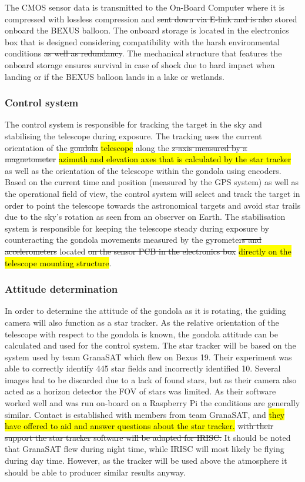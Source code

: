 The CMOS sensor data is transmitted to the On-Board Computer where it is compressed with lossless compression and \st{sent down via E-link and is also} stored onboard the BEXUS balloon. The onboard storage is located in the electronics box that is designed considering compatibility with the harsh environmental conditions \st{as well as redundancy}. The mechanical structure that features the onboard storage ensures survival in case of shock due to hard impact when landing or if the BEXUS balloon lands in a lake or wetlands.


\subsubsection{Control system}
The control system is responsible for tracking the target in the sky and stabilising the telescope during exposure. The tracking uses the current orientation of the \st{gondola} \hl{telescope} along the \st{z-axis measured by a magnetometer} \hl{azimuth and elevation axes that is calculated by the star tracker} as well as the orientation of the telescope within the gondola using encoders. Based on the current time and position (measured by the GPS system) as well as the operational field of view, the control system will select and track the target in order to point the telescope towards the astronomical targets and avoid star trails due to the sky's rotation as seen from an observer on Earth. The stabilisation system is responsible for keeping the telescope steady during exposure by counteracting the gondola movements measured by the gyrometer\st{s and accelerometers} located \st{on the sensor PCB in the electronics box} \hl{directly on the telescope mounting structure}.


\subsubsection{Attitude determination}
\label{sec::4-1_attitude_determination}
In order to determine the attitude of the gondola as it is rotating, the guiding camera will also function as a star tracker. As the relative orientation of the telescope with respect to the gondola is known, the gondola attitude can be calculated and used for the control system. The star tracker will be based on the system used by team GranaSAT which flew on Bexus 19. Their experiment was able to correctly identify 445 star fields and incorrectly identified 10. Several images had to be discarded due to a lack of found stars, but as their camera also acted as a horizon detector the FOV of stars was limited. As their software worked well and was run on-board on a Raspberry Pi the conditions are generally similar. Contact is established with members from team GranaSAT, and \hl{they have offered to aid and answer questions about the star tracker.} \st{with their support the star tracker software will be adapted for IRISC.} It should be noted that GranaSAT flew during night time, while IRISC will most likely be flying during day time. However, as the tracker will be used above the atmosphere it should be able to producer similar results anyway.

